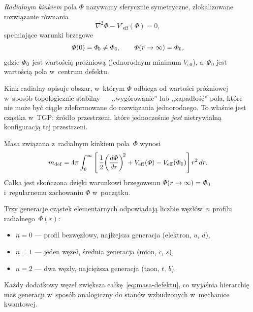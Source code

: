 \begin{definition}\label{def:kink}
\emph{Radialnym kinkiem} pola $\Phi$ nazywamy sferycznie
symetryczne, zlokalizowane rozwi\k{a}zanie r\'ownania
\begin{equation}\label{eq:kink}
    \nabla^2\Phi - V'_{\mathrm{eff}}(\Phi) = 0,
\end{equation}
spe\l{}niaj\k{a}ce warunki brzegowe
\begin{equation}\label{eq:kink-bc}
    \varPhi(0) = \varPhi_{\!0} \neq \varPhi_0, \qquad
    \varPhi(r\to\infty) = \varPhi_0,
\end{equation}
gdzie $\varPhi_0$ jest warto\'sci\k{a} pr\'o\.zniow\k{a} (jednorodnym
minimum $V_{\mathrm{eff}}$), a~$\Phi_{\!0}$ jest warto\'sci\k{a}
pola w~centrum defektu.
\end{definition}

Kink radialny opisuje obszar, w~kt\'orym $\Phi$ odbiega od
warto\'sci pr\'o\.zniowej w~spos\'ob topologicznie stabilny ---
,,wyg\'orowanie'' lub ,,zapad\l{}o\'s\'c'' pola, kt\'ore nie mo\.ze
by\'c ci\k{a}gle zdeformowane do rozwi\k{a}zania jednorodnego.
To w\l{}a\'snie jest cz\k{a}stka w~TGP: \'zr\'od\l{}o przestrzeni,
kt\'ore jednocze\'snie \emph{jest} nietrywialn\k{a} konfiguracj\k{a}
tej przestrzeni.

\begin{proposition}\label{prop:masa-defektu}
Masa zwi\k{a}zana z~radialnym kinkiem pola~$\Phi$ wynosi
\begin{equation}\label{eq:masa-defektu}
    m_{\mathrm{def}} = 4\pi \int_0^{\infty}
    \left[\,\frac{1}{2}\!\left(\frac{d\varPhi}{dr}\right)^{\!2}
    + V_{\mathrm{eff}}(\varPhi)
    - V_{\mathrm{eff}}(\varPhi_0)\right] r^2\,dr.
\end{equation}
Ca\l{}ka jest sko\'nczona dzi\k{e}ki warunkowi brzegowemu
$\varPhi(r\to\infty) = \varPhi_0$ i~regularnemu zachowaniu
$\Phi$ w~pocz\k{a}tku.
\end{proposition}

\begin{hypothesis}%
\label{hyp:generacje}
Trzy generacje cz\k{a}stek elementarnych odpowiadaj\k{a} liczbie
w\k{e}z\l{}\'ow~$n$ profilu radialnego~$\Phi(r)$:
\begin{itemize}[nosep]
  \item $n=0$ --- profil bezw\k{e}z\l{}owy, najl\.zejsza generacja
        (elektron, $u$, $d$),
  \item $n=1$ --- jeden w\k{e}ze\l{}, \'srednia generacja
        (mion, $c$, $s$),
  \item $n=2$ --- dwa w\k{e}z\l{}y, najci\k{e}\.zsza generacja
        (taon, $t$, $b$).
\end{itemize}
Ka\.zdy dodatkowy w\k{e}ze\l{} zwi\k{e}ksza ca\l{}k\k{e}~\eqref{eq:masa-defektu},
co wyja\'snia hierarchi\k{e} mas generacji w~spos\'ob analogiczny
do stanów wzbudzonych w~mechanice kwantowej.
\end{hypothesis}

